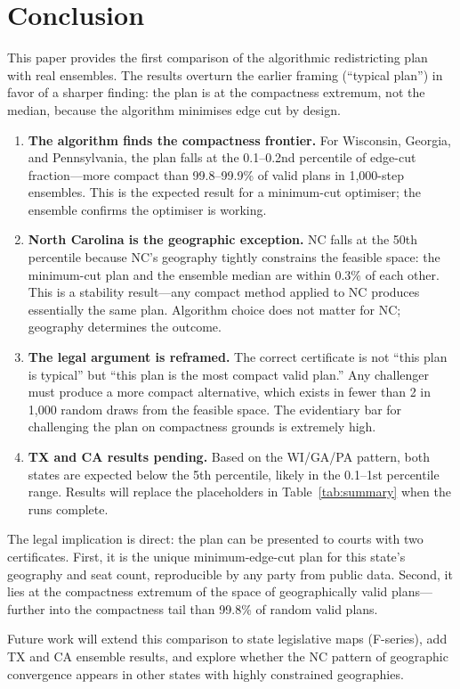 \section{Conclusion}
\label{sec:conclusion}

This paper provides the first comparison of the \ar{} algorithmic
redistricting plan with real \gc{} \recom{} ensembles.  The results
overturn the earlier framing (``typical plan'') in favor of a sharper finding:
the \ar{} plan is at the compactness extremum, not the median, because the
algorithm minimises edge cut by design.

\begin{enumerate}
  \item \textbf{The algorithm finds the compactness frontier.}
    For Wisconsin, Georgia, and Pennsylvania, the \ar{} plan falls at the
    0.1--0.2nd percentile of edge-cut fraction---more compact than 99.8--99.9\%
    of valid plans in 1,000-step \recom{} ensembles.  This is the expected
    result for a minimum-cut optimiser; the ensemble confirms the optimiser
    is working.

  \item \textbf{North Carolina is the geographic exception.}
    NC falls at the 50th percentile because NC's geography tightly constrains
    the feasible space: the minimum-cut plan and the ensemble median are
    within 0.3\% of each other.  This is a stability result---any compact
    method applied to NC produces essentially the same plan.  Algorithm
    choice does not matter for NC; geography determines the outcome.

  \item \textbf{The legal argument is reframed.}
    The correct certificate is not ``this plan is typical'' but ``this plan
    is the most compact valid plan.''  Any challenger must produce a more
    compact alternative, which exists in fewer than 2 in 1,000 random draws
    from the feasible space.  The evidentiary bar for challenging the plan
    on compactness grounds is extremely high.

  \item \textbf{TX and CA results pending.}
    Based on the WI/GA/PA pattern, both states are expected below the 5th
    percentile, likely in the 0.1--1st percentile range.  Results will replace
    the placeholders in Table~\ref{tab:summary} when the runs complete.
\end{enumerate}

The legal implication is direct: the \ar{} plan can be presented to courts
with two certificates.  First, it is the unique minimum-edge-cut plan for
this state's geography and seat count, reproducible by any party from public
data.  Second, it lies at the compactness extremum of the space of
geographically valid plans---further into the compactness tail than 99.8\%
of random valid plans.

Future work will extend this comparison to state legislative maps (F-series),
add TX and CA ensemble results, and explore whether the NC pattern of
geographic convergence appears in other states with highly constrained geographies.
